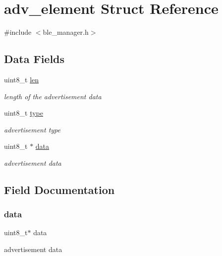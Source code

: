 \hypertarget{structadv__element}{}\section{adv\+\_\+element Struct Reference}
\label{structadv__element}


{\ttfamily \#include $<$ble\+\_\+manager.\+h$>$}

\subsection*{Data Fields}
\begin{DoxyCompactItemize}
\item 
uint8\+\_\+t \mbox{\hyperlink{structadv__element_a5723e60ffd628510c699eddbce90be23}{len}}
\begin{DoxyCompactList}\small\item\em length of the advertisement data \end{DoxyCompactList}\item 
uint8\+\_\+t \mbox{\hyperlink{structadv__element_a1d127017fb298b889f4ba24752d08b8e}{type}}
\begin{DoxyCompactList}\small\item\em advertisement type \end{DoxyCompactList}\item 
uint8\+\_\+t $\ast$ \mbox{\hyperlink{structadv__element_abe222f6d3581e7920dcad5306cc906a8}{data}}
\begin{DoxyCompactList}\small\item\em advertisement data \end{DoxyCompactList}\end{DoxyCompactItemize}


\subsection{Field Documentation}
\mbox{\label{structadv__element_abe222f6d3581e7920dcad5306cc906a8}} 
\subsubsection{\texorpdfstring{data}{data}}
{\footnotesize\ttfamily uint8\+\_\+t$\ast$ data}



advertisement data 

